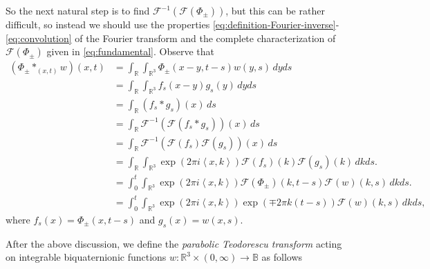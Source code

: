 \documentclass[12pt]{article}
\def\R{\mathbb{R}}
\def\R{\mathbb{R}}
\newcommand{\inner}[1]{\left\langle #1 \right\rangle}
\newcommand{\fourier}[1]{\mathcal{F}\left( #1 \right)}
\newcommand{\fourierinv}[1]{\mathcal{F}^{-1}\left( #1 \right)}
\newcommand{\expo}[1]{\exp\left( #1\right)}
\begin{document}
So the next natural step is to find $\fourierinv{\fourier{\Phi_\pm}}$, but this can be rather difficult, so instead we should use the properties \eqref{eq:definition-Fourier-inverse}-\eqref{eq:convolution} of the Fourier transform and the complete characterization of $\fourier{\Phi_{\pm}}$ given in \eqref{eq:fundamental}. Observe that
\begin{align*}
(\Phi_\pm*_{(x,t)}w)(x,t)&=\int_{\R}\int_{\R^3}\Phi_\pm(x-y,t-s)w(y,s)\, dy ds\\
    &=\int_{\R}\int_{\R^3}f_s(x-y)g_s(y)\, dy ds\\
    &=\int_{\R} (f_s*g_s)(x)\, ds\\
    &=\int_{\R}\fourierinv{\fourier{f_s*g_s}}(x)\, ds\\
    &=\int_{\R}\fourierinv{\fourier{f_s}\fourier{g_s}}(x)\, ds\\
    &=\int_{\R}\int_{\R^3}\expo{2\pi i\inner{x,k}}\fourier{f_s}(k)\fourier{g_s}(k)\, dkds.\\
    &=\int_0^t\int_{\R^3}\expo{2\pi i\inner{x,k}}\fourier{\Phi_\pm}(k,t-s)\fourier{w}(k,s)\, dkds.\\
    &=\int_0^t\int_{\R^3}\expo{2\pi i\inner{x,k}}\expo{\mp 2\pi k(t-s)}\fourier{w}(k,s)\, dkds,
\end{align*}
where $f_s(x)=\Phi_\pm(x,t-s)$ and $g_s(x)=w(x,s).$ 

After the above discussion, we define the \textit{parabolic Teodorescu transform} acting on integrable biquaternionic functions $w \colon \mathbb{R}^3\times(0,\infty) \rightarrow \mathbb{B}$ as follows
\end{document}
